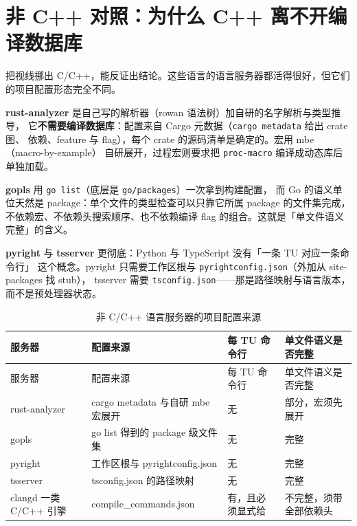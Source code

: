 \documentclass[12pt,a4paper,fontset=fandol]{ctexbook}
\begin{document}
\section{非 C++ 对照：为什么 C++ 离不开编译数据库}\label{sec:ch06-s5}

把视线挪出 C/C++，能反证出结论。这些语言的语言服务器都活得很好，但它们的项目配置形态完全不同。

\textbf{rust-analyzer} 是自己写的解析器（rowan 语法树）加自研的名字解析与类型推导，
它\textbf{不需要编译数据库}：配置来自 Cargo 元数据（\texttt{cargo metadata} 给出 crate 图、
依赖、feature 与 flag），每个 crate 的源码清单是确定的。宏用 mbe（macro-by-example）
自研展开，过程宏则要求把 \texttt{proc-macro} 编译成动态库后单独加载。

\textbf{gopls} 用 \texttt{go list}（底层是 \texttt{go/packages}）一次拿到构建配置，
而 Go 的语义单位天然是 package：单个文件的类型检查可以只靠它所属 package 的文件集完成，
不依赖宏、不依赖头搜索顺序、也不依赖编译 flag 的组合。这就是「单文件语义完整」的含义。

\textbf{pyright} 与 \textbf{tsserver} 更彻底：Python 与 TypeScript 没有「一条 TU 对应一条命令行」
这个概念。pyright 只需要工作区根与 \texttt{pyrightconfig.json}（外加从 site-packages 找 stub），
tsserver 需要 \texttt{tsconfig.json}——那是路径映射与语言版本，而不是预处理器状态。

{\small\setlength{\tabcolsep}{3pt}
\begin{longtable}{>{\raggedright\arraybackslash}p{} >{\raggedright\arraybackslash}p{} >{\raggedright\arraybackslash}p{} >{\raggedright\arraybackslash}p{}}
\caption{非 C/C++ 语言服务器的项目配置来源}\label{tab:ch06-noncpp}\\
\toprule
服务器 & 配置来源 & 每 TU 命令行 & 单文件语义是否完整 \\
\midrule
\endfirsthead
\toprule
服务器 & 配置来源 & 每 TU 命令行 & 单文件语义是否完整 \\
\midrule
\endhead
\bottomrule
\endfoot
rust-analyzer & cargo metadata 与自研 mbe 宏展开 & 无 & 部分，宏须先展开 \\
gopls & go list 得到的 package 级文件集 & 无 & 完整 \\
pyright & 工作区根与 pyrightconfig.json & 无 & 完整 \\
tsserver & tsconfig.json 的路径映射 & 无 & 完整 \\
clangd 一类 C/C++ 引擎 & compile\_commands.json & 有，且必须显式给 & 不完整，须带全部依赖头 \\
\end{longtable}}
\end{document}
